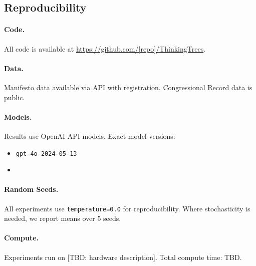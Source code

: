 \subsection{Reproducibility}

\paragraph{Code.}
All code is available at \url{https://github.com/[repo]/ThinkingTrees}.

\paragraph{Data.}
Manifesto data available via API with registration. Congressional Record data is public.

\paragraph{Models.}
Results use OpenAI API models. Exact model versions:
\begin{itemize}[nosep]
    \item \texttt{gpt-4o-2024-05-13}
    \item [TBD: Other models used]
\end{itemize}

\paragraph{Random Seeds.}
All experiments use \texttt{temperature=0.0} for reproducibility. Where stochasticity is needed, we report means over 5 seeds.

\paragraph{Compute.}
Experiments run on [TBD: hardware description]. Total compute time: TBD.
